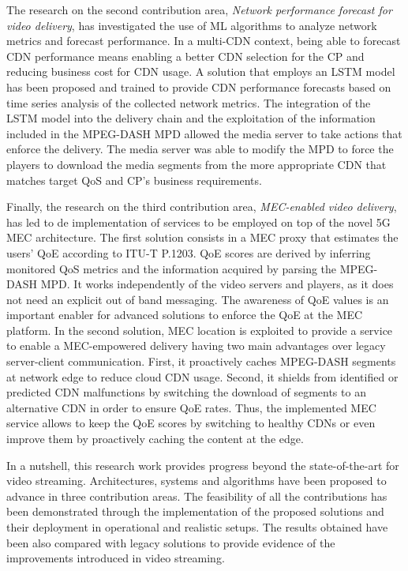 The research on the second contribution area, \textit{Network performance forecast for video delivery}, has investigated the use of ML algorithms to analyze network metrics and forecast performance. In a multi-CDN context, being able to forecast CDN performance means enabling a better CDN selection for the CP and reducing business cost for CDN usage.
A solution that employs an LSTM model has been proposed and trained to provide CDN performance forecasts based on time series analysis of the collected network metrics. The integration of the LSTM model into the delivery chain and the exploitation of the information included in the MPEG-DASH MPD allowed the media server to take actions that enforce the delivery. The media server was able to modify the MPD to force the players to download the media segments from the more appropriate CDN that matches target QoS and CP's business requirements.

Finally, the research on the third contribution area, \textit{MEC-enabled video delivery}, has led to de implementation of services to be employed on top of the novel 5G MEC architecture. The first solution consists in a MEC proxy that estimates the users' QoE according to ITU-T P.1203. QoE scores are derived by inferring monitored QoS metrics and the information acquired by parsing the MPEG-DASH MPD. It works independently of the video servers and players, as it does not need an explicit out of band messaging. The awareness of QoE values is an important enabler for advanced solutions to enforce the QoE at the MEC platform.
In the second solution, MEC location is exploited to provide a service to enable a MEC-empowered delivery having two main advantages over legacy server-client communication. First, it proactively caches MPEG-DASH segments at network edge to reduce cloud CDN usage. Second, it shields from identified or predicted CDN malfunctions by switching the download of segments to an alternative CDN in order to ensure QoE rates.
Thus, the implemented MEC service allows to keep the QoE scores by switching to healthy CDNs or even improve them by proactively caching the content at the edge.

In a nutshell, this research work provides progress beyond the state-of-the-art for video streaming. Architectures, systems and algorithms have been proposed to advance in three contribution areas. The feasibility of all the contributions has been demonstrated through the implementation of the proposed solutions and their deployment in operational and realistic setups. The results obtained have been also compared with legacy solutions to provide evidence of the improvements introduced in video streaming.


